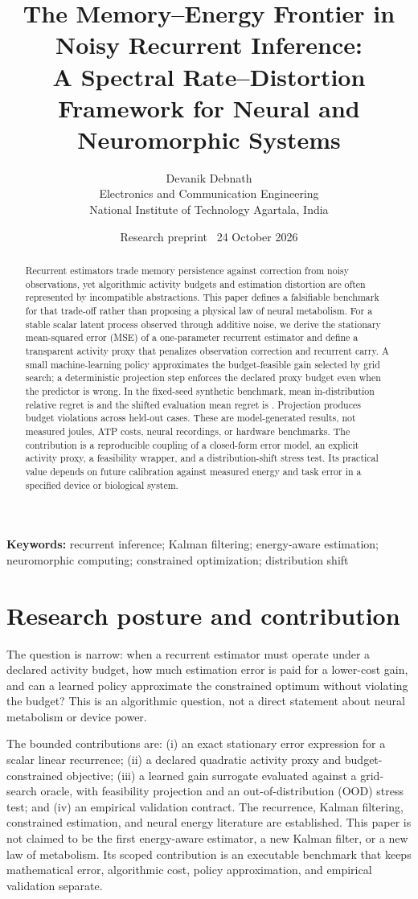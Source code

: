 \documentclass[10pt,a4paper]{article}
\title{\vspace{-1em}\bfseries The Memory--Energy Frontier in Noisy Recurrent Inference:\\[0.25em]\large A Spectral Rate--Distortion Framework for Neural and Neuromorphic Systems}
\author{Devanik Debnath\\\small Electronics and Communication Engineering\\\small National Institute of Technology Agartala, India}
\date{\small Research preprint \textbullet\ 24 October 2026}
\begin{document}
\maketitle
\vspace{-0.7em}
\begin{abstract}
Recurrent estimators trade memory persistence against correction from noisy observations, yet algorithmic activity budgets and estimation distortion are often represented by incompatible abstractions. This paper defines a falsifiable benchmark for that trade-off rather than proposing a physical law of neural metabolism. For a stable scalar latent process observed through additive noise, we derive the stationary mean-squared error (MSE) of a one-parameter recurrent estimator and define a transparent activity proxy that penalizes observation correction and recurrent carry. A small machine-learning policy approximates the budget-feasible gain selected by grid search; a deterministic projection step enforces the declared proxy budget even when the predictor is wrong. In the fixed-seed synthetic benchmark, mean in-distribution relative regret is \MeanIDRegret{} and the shifted evaluation mean regret is \MeanOODRegret{}. Projection produces \BudgetViolationCount{} budget violations across held-out cases. These are model-generated results, not measured joules, ATP costs, neural recordings, or hardware benchmarks. The contribution is a reproducible coupling of a closed-form error model, an explicit activity proxy, a feasibility wrapper, and a distribution-shift stress test. Its practical value depends on future calibration against measured energy and task error in a specified device or biological system.
\end{abstract}
\noindent\textbf{Keywords:} recurrent inference; Kalman filtering; energy-aware estimation; neuromorphic computing; constrained optimization; distribution shift

\section{Research posture and contribution}
The question is narrow: when a recurrent estimator must operate under a declared activity budget, how much estimation error is paid for a lower-cost gain, and can a learned policy approximate the constrained optimum without violating the budget? This is an algorithmic question, not a direct statement about neural metabolism or device power.

The bounded contributions are: (i) an exact stationary error expression for a scalar linear recurrence; (ii) a declared quadratic activity proxy and budget-constrained objective; (iii) a learned gain surrogate evaluated against a grid-search oracle, with feasibility projection and an out-of-distribution (OOD) stress test; and (iv) an empirical validation contract. The recurrence, Kalman filtering, constrained estimation, and neural energy literature are established. This paper is not claimed to be the first energy-aware estimator, a new Kalman filter, or a new law of metabolism. Its scoped contribution is an executable benchmark that keeps mathematical error, algorithmic cost, policy approximation, and empirical validation separate.
\end{document}
